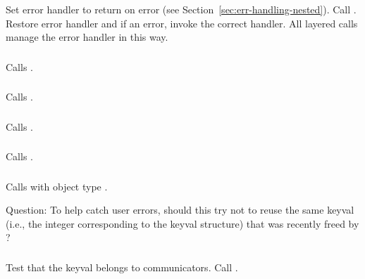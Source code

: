 \documentclass{article}
\begin{document}
\subsubsection{}
\begin{adi3}
Set error handler to return on error (see
Section~\ref{sec:err-handling-nested}).
Call .
Restore error handler and if an error, invoke the correct handler.
All layered calls manage the error handler in this way.
\end{adi3}

\subsubsection{}
Calls .

\subsubsection{}
Calls .

\subsubsection{}
Calls .

\subsubsection{}
Calls .

\subsubsection{}
Calls  with object type
. 

Question: To help catch user errors, should this try not to reuse the
same keyval (i.e., the integer corresponding to the keyval structure)
that was recently freed by ?

\subsubsection{}
Test that the keyval belongs to communicators.  Call
. 
\end{document}

